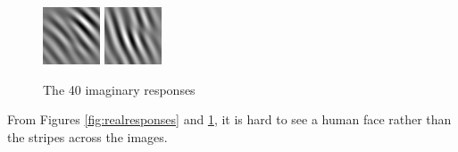 \begin{figure}
\begin{center}
  \includegraphics[width=\columnwidth/9]{ch4/figures/imag_3_6.jpg}
  \includegraphics[width=\columnwidth/9]{ch4/figures/imag_3_7.jpg}\\
\caption{The 40 imaginary responses}
\label{fig:imagresponses}
 \end{center}
\end{figure} 
From \mbox{Figures} \ref{fig:realresponses} and \ref{fig:imagresponses}, it is hard to see a human face rather than the stripes across the images.

